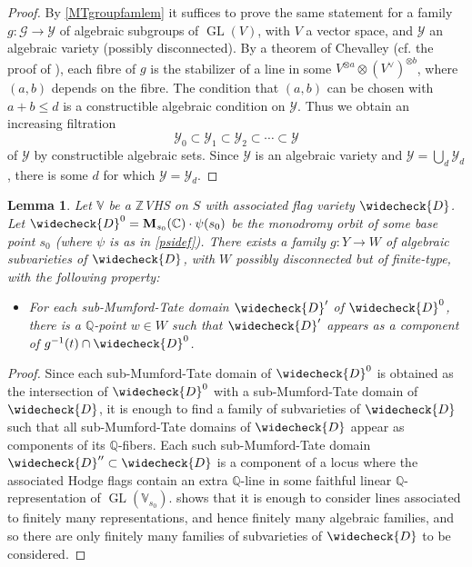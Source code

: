\documentclass[10pt]{article}
\numberwithin{equation}{section}
\theoremstyle{plain}
\newtheorem{lem}[thm]{Lemma}
\theoremstyle{definition}
\theoremstyle{remark}
\newcommand{\ch}[1]{\widecheck{{#1}}}
\newcommand{\GL}{\operatorname{GL}}
\newcommand{\C}{\mathbb{C}}
\newcommand{\Q}{\mathbb{Q}}
\newcommand{\Z}{\mathbb{Z}}
\newcommand{\V}{\mathbb{V}}
\begin{document}
\begin{proof}
By \autoref{MTgroupfamlem} it suffices to prove the same statement for a family $g : \mathcal{G} \to \mathcal{Y}$ of algebraic subgroups of $\GL(V)$, with $V$ a vector space, and $\mathcal{Y}$ an algebraic variety (possibly disconnected). By a theorem of Chevalley (cf. the proof of ), each fibre of $g$ is the stabilizer of a line in some $V^{\otimes a} \otimes (V^{\vee})^{\otimes b}$, where $(a,b)$ depends on the fibre. The condition that $(a,b)$ can be chosen with $a + b \leq d$ is a constructible algebraic condition on $\mathcal{Y}$. Thus we obtain an increasing filtration
\[ \mathcal{Y}_{0} \subset \mathcal{Y}_{1} \subset \mathcal{Y}_{2} \subset \cdots \subset \mathcal{Y} \]
of $\mathcal{Y}$ by constructible algebraic sets. Since $\mathcal{Y}$ is an algebraic variety and $\mathcal{Y} = \bigcup_{d} \mathcal{Y}_{d}$, there is some $d$ for which $\mathcal{Y} = \mathcal{Y}_{d}$. 
\end{proof}

\begin{lem}
\label{finitelymanyNLequivlem}
Let $\V$ be a $\Z$VHS on $S$ with associated flag variety $\ch{D}$. Let $\ch{D}^0= \mathbf{M}_{s_0}(\C) \cdot \psi (s_0)$ be the monodromy orbit of some base point $s_0$ (where $\psi$ is as in \eqref{psidef}). There exists a family $g : Y \to W$ of algebraic subvarieties of $\ch{D}$, with $W$ possibly disconnected but of finite-type, with the following property:
\begin{itemize}
    \item For each sub-Mumford-Tate domain $\ch{D}'$ of $\ch{D}^0$, there is a $\mathbb{Q}$-point $w \in W$ such that $\ch{D}'$ appears as a component of $g^{-1}(t) \cap \ch{D}^0$.
\end{itemize}
\end{lem}

\begin{proof}
Since each sub-Mumford-Tate domain of $\ch{D}^0$ is obtained as the intersection of $\ch{D}^0$ with a sub-Mumford-Tate domain of $\ch{D}$, it is enough to find a family of subvarieties of $\ch{D}$ such that all sub-Mumford-Tate domains of $\ch{D}$ appear as components of its $\Q$-fibers. Each such sub-Mumford-Tate domain $\ch{D}''\subset \ch{D}$ is a component of a locus where the associated Hodge flags contain an extra $\Q$-line in some faithful linear $\Q$-representation of $\GL (\V_{s_0})$.  shows that it is enough to consider lines associated to finitely many representations, and hence finitely many algebraic families, and so there are only finitely many families of subvarieties of $\ch{D}$ to be considered.
\end{proof}
\end{document}

